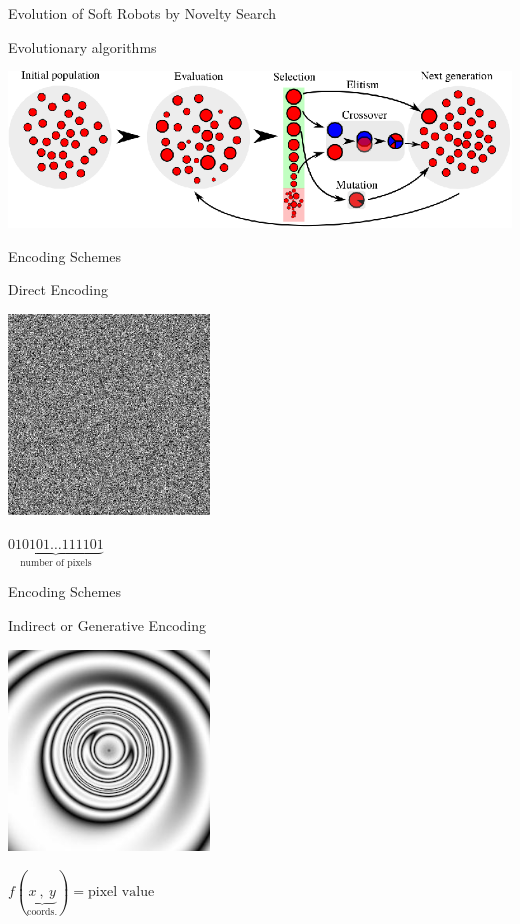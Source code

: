 \documentclass[6pt]{beamer}
\begin{document}
{

\begin{frame}{Evolution {\scriptsize of Soft Robots by Novelty Search}}
\begin{block}{Evolutionary algorithms}
\begin{center}
\includegraphics[width=1.0\textwidth]{../Figures/Misc/Evolution.eps}
\end{center}
\end{block}
\end{frame}

\begin{frame}{Encoding Schemes}
\begin{block}{Direct Encoding}
\begin{center}
\includegraphics[width=0.4\textwidth]{../Figures/Misc/direct.jpg}
\end{center}
\end{block}
\centering
$\underbrace{010101\ldots111101}_\text{number of pixels}$
\end{frame}

\begin{frame}{Encoding Schemes}
\begin{block}{Indirect or Generative Encoding}
\begin{center}
\includegraphics[width=0.4\textwidth]{../Figures/Misc/picBreed1.jpg}
\end{center}
\end{block}
\centering
$f(\underbrace{x\   ,\  y}_\text{coords.}) = \text{pixel value}$
\end{frame}
}
\end{document}
